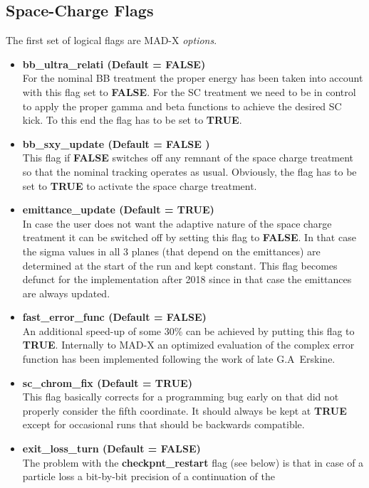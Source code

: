 \subsection{Space-Charge Flags}
The first set of logical flags are MAD-X {\it options}.
\begin{itemize}
\item {\bf bb\_ultra\_relati (Default =  FALSE)}\\ For the nominal BB
  treatment the proper energy has been taken into account with this
  flag set to {\bf FALSE}. For the SC treatment we need to be in
  control to apply the proper gamma and beta functions to achieve the
  desired SC kick. To this end the flag has to be set to {\bf TRUE}.
\item {\bf bb\_sxy\_update (Default = FALSE )}\\ This flag if {\bf
  FALSE} switches off any remnant of the space charge treatment so
  that the nominal tracking operates as usual. Obviously, the flag has
  to be set to {\bf TRUE} to activate the space charge treatment.
\item {\bf emittance\_update (Default = TRUE)}\\ In case the user
  does not want the adaptive nature of the space charge treatment it
  can be switched off by setting this flag to {\bf FALSE}. In that
  case the sigma values in all 3 planes (that depend on the
  emittances) are determined at the start of the run and kept
  constant. This flag becomes defunct for the implementation after
  2018 since in that case the emittances are always updated.
\item {\bf fast\_error\_func (Default = FALSE)}\\ An additional
  speed-up of some 30\% can be achieved by putting this flag to {\bf
    TRUE}. Internally to MAD-X an optimized evaluation of the
  complex error function has been implemented following the work of
  late G.A~Erskine.
\item {\bf sc\_chrom\_fix (Default = TRUE)}\\ This flag basically
  corrects for a programming bug early on that did not properly
  consider the fifth coordinate. It should always be kept at {\bf
    TRUE} except for occasional runs that should be backwards
  compatible.
\item {\bf exit\_loss\_turn (Default = FALSE)}\\ The problem with
  the {\bf checkpnt\_restart} flag (see below) is that in case of a
  particle loss a bit-by-bit precision of a continuation of the

\end{itemize}
